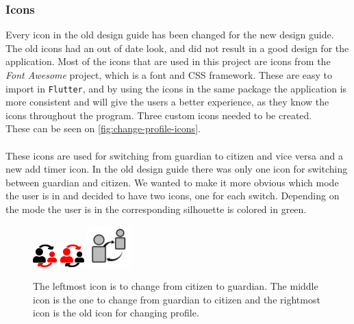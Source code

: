 \subsubsection{Icons}
Every icon in the old design guide has been changed for the new design guide.
The old icons had an out of date look, and did not result in a good design for the application.
Most of the icons that are used in this project are icons from the \textit{Font Awesome} project, which is a font and CSS framework.
These are easy to import in \texttt{Flutter}, and by using the icons in the same package the application is more consistent and will give the users a better experience, as they know the icons throughout the program.
Three custom icons needed to be created. \\
These can be seen on \autoref{fig:change-profile-icons}. \\\\
These icons are used for switching from guardian to citizen and vice versa and a new add timer icon.
In the old design guide there was only one icon for switching between guardian and citizen.
We wanted to make it more obvious which mode the user is in and decided to have two icons, one for each switch.
Depending on the mode the user is in the corresponding silhouette is colored in green.

\begin{figure}[htp]

    \centering
    \includegraphics[width=.1\textwidth]{figures/changeToGuardian}\hfill
    \includegraphics[width=.1\textwidth]{figures/changeToCitizen}\hfill
    \includegraphics[width=.1\textwidth]{figures/old-change-profile}
    
    \caption{ The leftmost icon is to change from citizen to guardian. The middle icon is the one to change from guardian to citizen and the rightmost icon is the old icon for changing profile.}
    \label{fig:change-profile-icons}
\end{figure}


